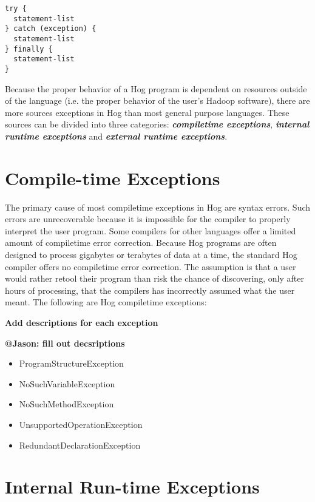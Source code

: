 \documentclass{book}
\begin{document}
\begin{verbatim}
try {
  statement-list
} catch (exception) {
  statement-list
} finally {
  statement-list
}
\end{verbatim}

Because the proper behavior of a Hog program is dependent on resources outside of
the language (i.e. the proper behavior of the user’s Hadoop software), there are
more sources exceptions in Hog than most general purpose languages. These sources
can be divided into three categories: \textbf{\emph{compile­time exceptions}},
\textbf{\emph{internal run­time exceptions}} and \textbf{\emph{external run­time
exceptions}}.

\section{Compile-time Exceptions} %
\label{sec:compile_time_exceptions}

The primary cause of most compile­time exceptions in Hog are syntax errors. Such
errors are unrecoverable because it is impossible for the compiler to properly
interpret the user program. Some compilers for other languages offer a limited
amount of compile­time error correction. Because Hog programs are often designed
to process gigabytes or terabytes of data at a time, the standard Hog compiler
offers no compile­time error correction. The assumption is that a user would
rather re­tool their program than risk the chance of discovering, only after hours
of processing, that the compilers has incorrectly assumed what the user meant. The
following are Hog compile­time exceptions:

\textbf{Add descriptions for each exception}

\textbf{@Jason: fill out decsriptions}

\begin{itemize}
  \item[] ProgramStructureException
  \item[] NoSuchVariableException
  \item[] NoSuchMethodException
  \item[] UnsupportedOperationException
  \item[] RedundantDeclarationException
\end{itemize}


\section{Internal Run-time Exceptions} %
\label{sec:internal_run_time_exceptions}
\end{document}
